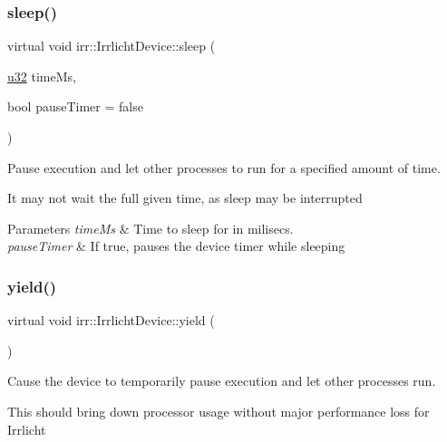 \subsubsection{\texorpdfstring{sleep()}{sleep()}\hspace{0.1cm}{\footnotesize\ttfamily [2/2]}}
{\footnotesize\ttfamily virtual void irr\+::\+Irrlicht\+Device\+::sleep (\begin{DoxyParamCaption}\item[{\hyperlink{namespaceirr_a0416a53257075833e7002efd0a18e804}{u32}}]{time\+Ms,  }\item[{bool}]{pause\+Timer = {\ttfamily false} }\end{DoxyParamCaption})\hspace{0.3cm}{\ttfamily [pure virtual]}}



Pause execution and let other processes to run for a specified amount of time. 

It may not wait the full given time, as sleep may be interrupted 
\begin{DoxyParams}{Parameters}
{\em time\+Ms} & Time to sleep for in milisecs. \\
\hline
{\em pause\+Timer} & If true, pauses the device timer while sleeping \\
\hline
\end{DoxyParams}
\mbox{\label{classirr_1_1IrrlichtDevice_a731727774fad9fc4c6c1c85277ca36dc}} 
\subsubsection{\texorpdfstring{yield()}{yield()}\hspace{0.1cm}{\footnotesize\ttfamily [1/2]}}
{\footnotesize\ttfamily virtual void irr\+::\+Irrlicht\+Device\+::yield (\begin{DoxyParamCaption}{ }\end{DoxyParamCaption})\hspace{0.3cm}{\ttfamily [pure virtual]}}



Cause the device to temporarily pause execution and let other processes run. 

This should bring down processor usage without major performance loss for Irrlicht \mbox{\label{classirr_1_1IrrlichtDevice_a731727774fad9fc4c6c1c85277ca36dc}} 
